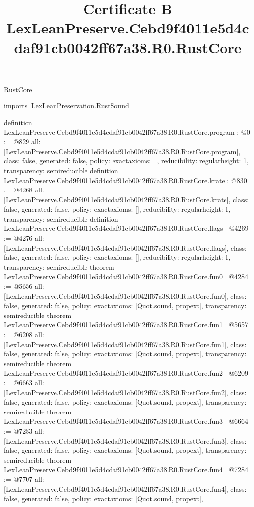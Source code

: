 \begin{lexlean}{RustCore}
\title{Certificate B LexLeanPreserve.Cebd9f4011e5d4cdaf91cb0042ff67a38.R0.RustCore}
\begin{coremodule}
imports [LexLeanPreservation.RustSound]

definition LexLeanPreserve.Cebd9f4011e5d4cdaf91cb0042ff67a38.R0.RustCore.program : @0 := @829 {
  all: [LexLeanPreserve.Cebd9f4011e5d4cdaf91cb0042ff67a38.R0.RustCore.program],
  class: false,
  generated: false,
  policy: exact{axioms: []},
  reducibility: regular{height: 1},
  transparency: semireducible
}
definition LexLeanPreserve.Cebd9f4011e5d4cdaf91cb0042ff67a38.R0.RustCore.krate : @830 := @4268 {
  all: [LexLeanPreserve.Cebd9f4011e5d4cdaf91cb0042ff67a38.R0.RustCore.krate],
  class: false,
  generated: false,
  policy: exact{axioms: []},
  reducibility: regular{height: 1},
  transparency: semireducible
}
definition LexLeanPreserve.Cebd9f4011e5d4cdaf91cb0042ff67a38.R0.RustCore.flags : @4269 := @4276 {
  all: [LexLeanPreserve.Cebd9f4011e5d4cdaf91cb0042ff67a38.R0.RustCore.flags],
  class: false,
  generated: false,
  policy: exact{axioms: []},
  reducibility: regular{height: 1},
  transparency: semireducible
}
theorem LexLeanPreserve.Cebd9f4011e5d4cdaf91cb0042ff67a38.R0.RustCore.fun0 : @4284 := @5656 {
  all: [LexLeanPreserve.Cebd9f4011e5d4cdaf91cb0042ff67a38.R0.RustCore.fun0],
  class: false,
  generated: false,
  policy: exact{axioms: [Quot.sound, propext]},
  transparency: semireducible
}
theorem LexLeanPreserve.Cebd9f4011e5d4cdaf91cb0042ff67a38.R0.RustCore.fun1 : @5657 := @6208 {
  all: [LexLeanPreserve.Cebd9f4011e5d4cdaf91cb0042ff67a38.R0.RustCore.fun1],
  class: false,
  generated: false,
  policy: exact{axioms: [Quot.sound, propext]},
  transparency: semireducible
}
theorem LexLeanPreserve.Cebd9f4011e5d4cdaf91cb0042ff67a38.R0.RustCore.fun2 : @6209 := @6663 {
  all: [LexLeanPreserve.Cebd9f4011e5d4cdaf91cb0042ff67a38.R0.RustCore.fun2],
  class: false,
  generated: false,
  policy: exact{axioms: [Quot.sound, propext]},
  transparency: semireducible
}
theorem LexLeanPreserve.Cebd9f4011e5d4cdaf91cb0042ff67a38.R0.RustCore.fun3 : @6664 := @7283 {
  all: [LexLeanPreserve.Cebd9f4011e5d4cdaf91cb0042ff67a38.R0.RustCore.fun3],
  class: false,
  generated: false,
  policy: exact{axioms: [Quot.sound, propext]},
  transparency: semireducible
}
theorem LexLeanPreserve.Cebd9f4011e5d4cdaf91cb0042ff67a38.R0.RustCore.fun4 : @7284 := @7707 {
  all: [LexLeanPreserve.Cebd9f4011e5d4cdaf91cb0042ff67a38.R0.RustCore.fun4],
  class: false,
  generated: false,
  policy: exact{axioms: [Quot.sound, propext]},
}
\end{coremodule}
\end{lexlean}
